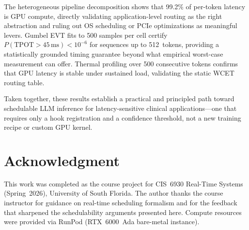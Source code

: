 \documentclass[conference]{IEEEtran}
\begin{document}
The heterogeneous pipeline decomposition shows that 99.2\% of per-token
latency is GPU compute, directly validating application-level routing as
the right abstraction and ruling out OS scheduling or PCIe optimizations
as meaningful levers.
Gumbel EVT fits to 500 samples per cell certify $P(\text{TPOT}>45\,\text{ms})<10^{-6}$
for sequences up to 512~tokens, providing a statistically grounded timing
guarantee beyond what empirical worst-case measurement can offer.
Thermal profiling over 500 consecutive tokens confirms that GPU latency
is stable under sustained load, validating the static WCET routing table.

Taken together, these results establish a practical and principled path
toward schedulable LLM inference for latency-sensitive clinical
applications---one that requires only a hook registration and a
confidence threshold, not a new training recipe or custom GPU kernel.

\section*{Acknowledgment}

This work was completed as the course project for CIS~6930 Real-Time
Systems (Spring~2026), University of South Florida.
The author thanks the course instructor for guidance on real-time
scheduling formalism and for the feedback that sharpened the
schedulability arguments presented here.
Compute resources were provided via RunPod (RTX~6000~Ada bare-metal instance).



\end{document}
